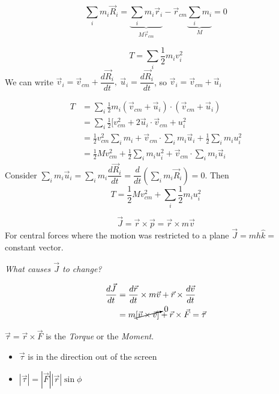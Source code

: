 \[\sum_im_i\vec{R}_i = \underbrace{\sum_im_i\vec{r}_i}_{M\vec{r}_{cm}}- \vec{r}_{cm}\underbrace{\sum_im_i}_{M} = 0\]








\[T = \sum_i \frac{1}{2}m_iv_i^2\]
We can write $\vec{v}_i = \vec{v}_{cm} + \dfrac{d\vec{R}_i}{dt},~\vec{u}_i = \dfrac{d\vec{R}_i}{dt}$, so $\vec{v}_i = \vec{v}_{cm} + \vec{u}_i$

\[\begin{aligned}T &= \sum_i \frac{1}{2}m_i(\vec{v}_{cm}+\vec{u}_i) \cdot(\vec{v}_{cm}+\vec{u}_i)\\
&= \sum_i \frac{1}{2}[v_{cm}^2 + 2\vec{u}_i\cdot\vec{v}_{cm} + u_i^2\\
&= 	\frac{1}{2}v_{cm}^2\sum_i m_i + \vec{v}_{cm}\cdot\sum_im_i\vec{u}_i + \frac{1}{2}\sum_im_iu_i^2\\
&= \frac{1}{2}Mv_{cm}^2 + \frac{1}{2}\sum_im_iu_i^2 + \vec{v}_{cm}\cdot\sum_im_i\vec{u}_i
\end{aligned}
\]
Consider $\sum_i m_i\vec{u}_i = \sum_im_i\dfrac{d\vec{R}_i}{dt} = \dfrac{d}{dt}(\sum_i m_i\vec{R}_i) = 0$. Then 
\begin{equation}\boxed{T = \frac{1}{2}Mv_{cm}^2 + \sum_i\frac{1}{2}m_iu_i^2}\end{equation}


\[\vec{J} = \vec{r} \times \vec{p} = \vec{r} \times m\vec{v}\]
For central forces where the motion was restricted to a plane $\vec{J} = mh\hat{k} =$ constant vector. 

\emph{What causes $\vec{J}$ to change?}

\[\begin{aligned}\frac{d\vec{J}}{dt} &= \frac{d\vec{r}}{dt} \times m \vec{v} + \vec{r}\times \frac{d\vec{v}}{dt}\\ &= m\cancelto{0}{[\vec{v} \times \vec{v}]} + \vec{r} \times \vec{F} = \vec{\tau}\end{aligned}
\]

\begin{definition}
$\vec{\tau} = \vec{r} \times \vec{F}$ is the \emph{Torque} or the \emph{Moment}. 
\vspace*{50pt}
\begin{itemize}
\item $\vec{\tau}$ is in the direction out of the screen
\item $|\vec{\tau}| = |\vec{F}||\vec{r}|\sin\phi$ 	
\end{itemize}
\end{definition}

